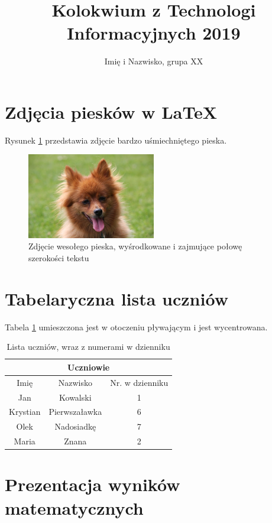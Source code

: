 \documentclass[10pt,a4paper]{article}
\title{Kolokwium z Technologi Informacyjnych 2019}
\author{Imię i Nazwisko, grupa XX}
\begin{document}
	
	\maketitle
	
	\tableofcontents
	
	\section{Zdjęcia piesków w \LaTeX}
	
	Rysunek \ref{dog} przedstawia zdjęcie bardzo uśmiechniętego pieska.
	
	\begin{figure}[h]
		\centering
		\includegraphics[width=0.5\textwidth]{pies.png}
		\caption{Zdjęcie wesołego pieska, wyśrodkowane i zajmujące połowę szerokości tekstu}
		\label{dog}
	\end{figure}

	\section{Tabelaryczna lista uczniów}
	
	Tabela \ref{uczniowie} umieszczona jest w otoczeniu pływającym i jest wycentrowana.
	
	\begin{table}[h!]
		\centering
		\begin{tabular}{c | c || c}
			\hline
			\multicolumn{3}{c}{Uczniowie} \\ \hline \hline
			Imię & Nazwisko & Nr. w dzienniku \\ \hline
			Jan & Kowalski & 1 \\
			Krystian & Pierwszaławka & 6 \\
			Olek & Nadosiadkę & 7 \\
			Maria & Znana & 2 \\
		\end{tabular}
		\caption{Lista uczniów, wraz z numerami w dzienniku}
		\label{uczniowie}
	\end{table}

	\section{Prezentacja wyników matematycznych}
	
\end{document}
